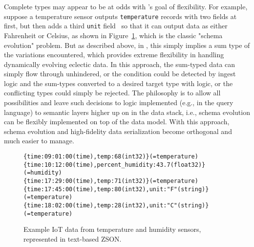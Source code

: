 Complete types may appear to be at odds with \sys{}'s goal of flexibility. For example, suppose a temperature sensor outputs \texttt{temperature} records with two fields at first, but then adds a third \texttt{unit} field~ so that it can output data as either Fahrenheit or Celsius, as shown in Figure~\ref{f:iot_data}, which is the classic "schema evolution" problem.  But as described above, in \sys{}, this simply implies a sum type of the variations encountered, which provides extreme flexibility in handling dynamically evolving eclectic data.  In this approach, the sum-typed data can simply flow through unhindered, or the condition could be detected by ingest logic and the sum-types converted to a desired target type with \sys{} logic, or the conflicting types could simply be rejected.  The \sys{} philosophy is to allow all possibilities and leave such decisions to logic implemented (e.g., in the \sys{} query language) to semantic layers higher up on in the data stack, i.e., schema evolution can be flexibly implemented on top of the \sys{} data model.  With this approach, schema evolution and high-fidelity data serialization become orthogonal and much easier to manage.

\begin{comment}
\begin{figure}
    \begin{verbatim}
{city:"Augusta"(string),population:18662(uint32)}(=city_schema)
{city:"Bangor"(string),population:32029(uint32)}(=city_schema)
{city:"Bar Harbor"(string),population:5535(uint32)}(=city_schema)
{city:"Bath"(string),state:"ME"(string),population:8333(uint32)} (=city_schema)
{city:"Belfast"(string),state:"ME"(string),population: 6710(uint32)}(=city_schema)
    \end{verbatim}
    \vspace{-1em}
    \caption{Example \sys{} data, represented in text-based ZSON.}
    \label{f:city_data}
\end{figure}
\end{comment}

\begin{figure}
    \begin{verbatim}
{time:09:01:00(time),temp:68(int32)}(=temperature)
{time:10:12:00(time),percent_humidity:43.7(float32)}(=humidity)
{time:17:29:00(time),temp:71(int32)}(=temperature)
{time:17:45:00(time),temp:80(int32),unit:"F"(string)}(=temperature)
{time:18:02:00(time),temp:28(int32),unit:"C"(string)}(=temperature)
    \end{verbatim}
    \vspace{-1.3em}
    \caption{Example IoT data from temperature and humidity sensors, represented in text-based ZSON.\shortorlongform{}{\footnotemark}}
    \label{f:iot_data}
    \vspace{-1.5em}
\end{figure}

